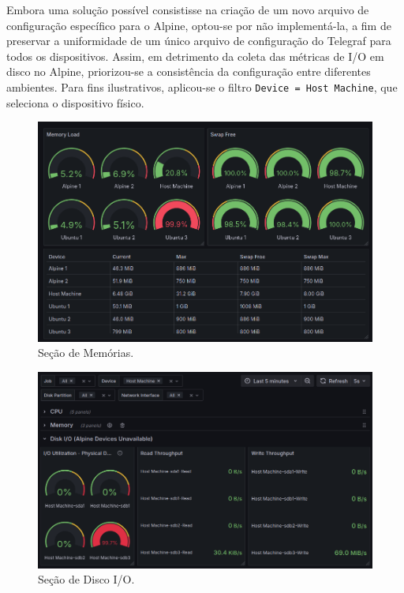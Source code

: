 Embora uma solução possível consistisse na criação de um novo arquivo de configuração específico para o Alpine, optou-se por não implementá-la, a fim de preservar a uniformidade de um único arquivo de configuração do Telegraf para todos os dispositivos. Assim, em detrimento da coleta das métricas de I/O em disco no Alpine, priorizou-se a consistência da configuração entre diferentes ambientes. Para fins ilustrativos, aplicou-se o filtro \verb|Device = Host Machine|, que seleciona o dispositivo físico.

\begin{figure}[H]
\centering
\setlength{\abovecaptionskip}{-20pt}
\includegraphics[width=\textwidth]{Imagens/chap04/dashboard/memory.png}
\caption{Seção de Memórias.}
\label{fig:dashboard-memory}
\end{figure}

\vspace{1cm}

\begin{figure}[H]
\centering
\setlength{\abovecaptionskip}{-20pt}
\includegraphics[width=\textwidth]{Imagens/chap04/dashboard/diskio.png}
\caption{Seção de Disco I/O.}
\label{fig:dashboard-diskio}
\end{figure}

